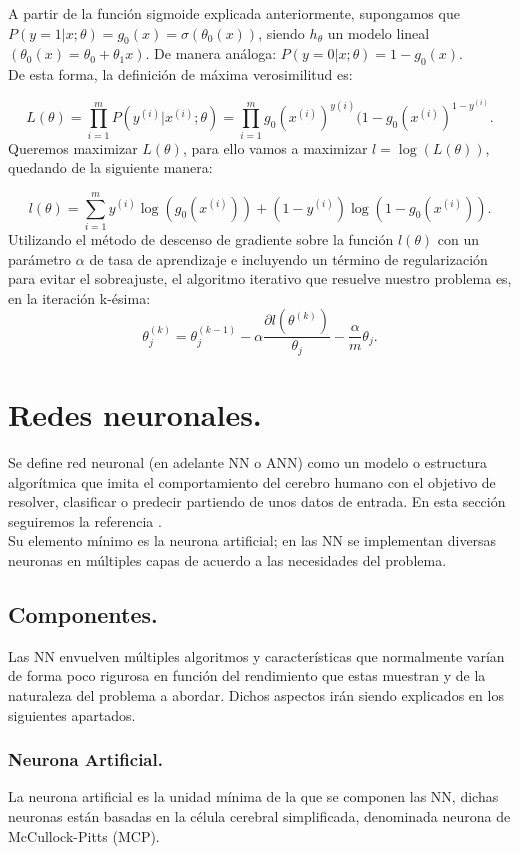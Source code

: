 \documentclass[a4paper,11pt]{article}
\begin{document}
\noindent
A partir de la función sigmoide explicada anteriormente,
supongamos que $P(y = 1 | x; \theta) = g_0(x) = \sigma(\theta_0(x))$, siendo $h_{\theta}$ un
modelo lineal $(\theta_0(x) = \theta_0 + \theta_1 x)$. De manera análoga:  $P(y = 0 | x; \theta) = 1-g_0(x)$.\\

\noindent
De esta forma, la definición de máxima verosimilitud es:

\[
L(\theta)=\prod_{i=1}^{m}P(y^{(i)}|x^{(i)};\theta)=\prod_{i=1}^{m}g_0(x^{(i)})^{y(i)}(1-g_0(x^{(i)})^{1-y^{(i)}}.
\]
Queremos maximizar $L(\theta)$,  para
ello vamos a maximizar $l = \log{(L(\theta))}$, quedando de la siguiente manera:

\[
l(\theta)=\sum_{i=1}^my^{(i)}\log{(g_0(x^{(i)}))}+(1-y^{(i)})\log{(1-g_0(x^{(i)}))}.
\]
Utilizando el método de descenso de gradiente sobre la función $l(\theta)$ con un
parámetro $\alpha$ de tasa de aprendizaje e incluyendo un término de regularización
para evitar el sobreajuste, el algoritmo iterativo que resuelve nuestro problema
es, en la iteración k-ésima:
\[
\theta_j^{(k)}=\theta_j^{(k-1)}-\alpha\frac{\partial l(\theta^{(k)})}{\theta_j}-\frac{\alpha}{m}\theta_j .
\]

\newpage
\section{Redes neuronales.}

Se define red neuronal (en adelante NN o ANN) como un modelo o estructura algorítmica que imita el comportamiento del cerebro humano con el objetivo de resolver, clasificar o predecir partiendo de unos datos de entrada. En esta sección seguiremos la referencia \cite{andrew}.\\

\noindent
Su elemento mínimo es la neurona artificial; en las NN se implementan diversas neuronas en múltiples capas de acuerdo a las necesidades del problema.

\subsection{Componentes.}
Las NN envuelven múltiples algoritmos y características que normalmente varían de forma poco rigurosa en función del rendimiento que estas muestran y de la naturaleza del problema a abordar. Dichos aspectos irán siendo explicados en los siguientes apartados.
\subsubsection{Neurona Artificial.}
La neurona artificial es la unidad mínima de la que se componen las NN, dichas neuronas están basadas en la célula cerebral simplificada, denominada neurona de McCullock-Pitts (MCP).\cite{andrew}\\
\end{document}

